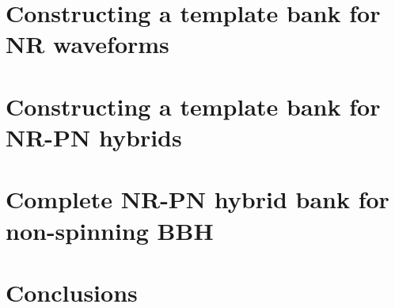 \documentclass[aps,
prd,
twocolumn,
superscriptaddress,
lengthcheck,showpacs,letterpaper,nofootinbib,
floatfix]{revtex4-1}
\begin{document}
%



\section{Constructing a template bank for NR waveforms}\label{s1:NRonlybank}


\section{Constructing a template bank for NR-PN hybrids}\label{s1:NRpNhybridbank}


\section{Complete NR-PN hybrid bank for non-spinning BBH}\label{s1:futureNRpNhybridbank}


\section{Conclusions}\label{s1:conclusions}


\acknowledgments

\end{document}
